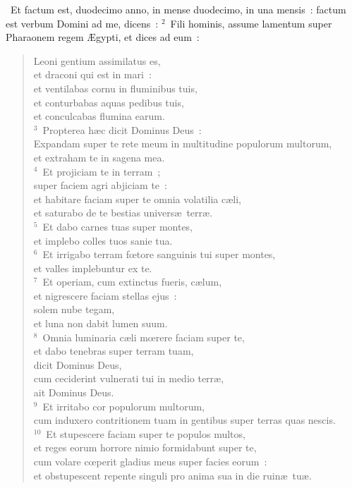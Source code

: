 ~Et factum est, duodecimo anno, in mense duodecimo, in una mensis~: factum est verbum Domini ad me, dicens~:
${}^{2}$~Fili hominis, assume lamentum super Pharaonem regem \AE gypti, et dices ad eum~: \begin{flushleft}\begin{verse}Leoni gentium assimilatus es,\\ et draconi qui est in mari~:\\ et ventilabas cornu in fluminibus tuis,\\ et conturbabas aquas pedibus tuis,\\ et conculcabas flumina earum.\\
${}^{3}$~Propterea h\ae c dicit Dominus Deus~:\\ Expandam super te rete meum in multitudine populorum multorum,\\ et extraham te in sagena mea.\\
${}^{4}$~Et projiciam te in terram~;\\ super faciem agri abjiciam te~:\\ et habitare faciam super te omnia volatilia c\ae li,\\ et saturabo de te bestias univers\ae\ terr\ae .\\
${}^{5}$~Et dabo carnes tuas super montes,\\ et implebo colles tuos sanie tua.\\
${}^{6}$~Et irrigabo terram fœtore sanguinis tui super montes,\\ et valles implebuntur ex te.\\
${}^{7}$~Et operiam, cum extinctus fueris, c\ae lum,\\ et nigrescere faciam stellas ejus~:\\ solem nube tegam,\\ et luna non dabit lumen suum.\\
${}^{8}$~Omnia luminaria c\ae li mœrere faciam super te,\\ et dabo tenebras super terram tuam,\\ dicit Dominus Deus,\\ cum ceciderint vulnerati tui in medio terr\ae ,\\ ait Dominus Deus.\\
${}^{9}$~Et irritabo cor populorum multorum,\\ cum induxero contritionem tuam in gentibus super terras quas nescis.\\
${}^{10}$~Et stupescere faciam super te populos multos,\\ et reges eorum horrore nimio formidabunt super te,\\ cum volare cœperit gladius meus super facies eorum~:\\ et obstupescent repente singuli pro anima sua in die ruin\ae\ tu\ae .\\

\end{verse}
\end{flushleft}
